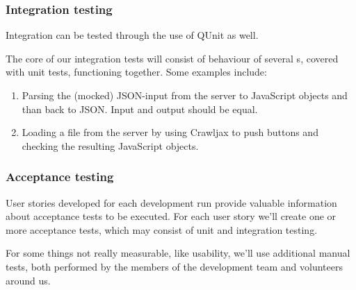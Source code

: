 \subsubsection{Integration testing}
Integration can be tested through the use of QUnit as well.

The core of our integration tests will consist of behaviour of several s, covered with unit tests, functioning together. Some examples include:
\begin{enumerate}
\item Parsing the (mocked) JSON-input from the server to JavaScript objects and than back to JSON. Input and output should be equal.
\item Loading a file from the server by using Crawljax to push buttons and checking the resulting JavaScript objects.
\end{enumerate}

\subsubsection{Acceptance testing}
User stories developed for each development run provide valuable information about acceptance tests to be executed. For each user story we'll create one or more acceptance tests, which may consist of unit and integration testing.

For some things not really measurable, like usability, we'll use additional manual tests, both performed by the members of the development team and volunteers around us.
